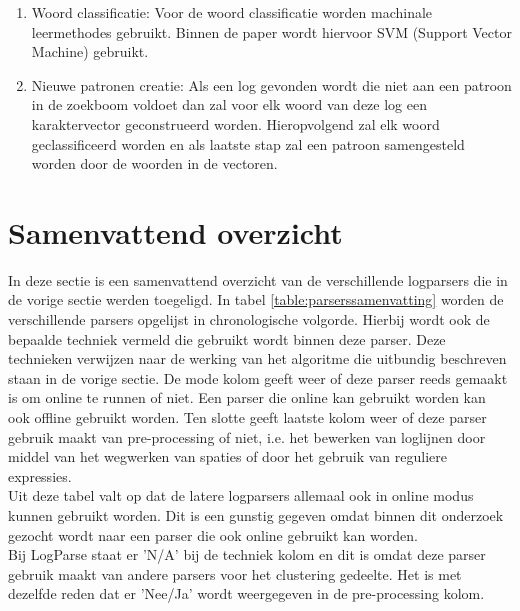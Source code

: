 \begin{itemize}
\begin{enumerate}
        \item Woord classificatie: Voor de woord classificatie worden machinale leermethodes gebruikt. Binnen de paper wordt hiervoor SVM (Support Vector Machine) gebruikt.
        
        \item Nieuwe patronen creatie: Als een log gevonden wordt die niet aan een patroon in de zoekboom voldoet dan zal voor elk woord van deze log een karaktervector geconstrueerd worden. Hieropvolgend zal elk woord geclassificeerd worden en als laatste stap zal een patroon samengesteld worden door de woorden in de vectoren.
    \end{enumerate}
\end{itemize}

\section{Samenvattend overzicht}
In deze sectie is een samenvattend overzicht van de verschillende logparsers die in de vorige sectie werden toegeligd. In tabel \ref{table:parserssamenvatting} worden de verschillende parsers opgelijst in chronologische volgorde. Hierbij wordt ook de bepaalde techniek vermeld die gebruikt wordt binnen deze parser. Deze technieken verwijzen naar de werking van het algoritme die uitbundig beschreven staan in de vorige sectie. De mode kolom geeft weer of deze parser reeds gemaakt is om online te runnen of niet. Een parser die online kan gebruikt worden kan ook offline gebruikt worden. Ten slotte geeft laatste kolom weer of deze parser gebruik maakt van pre-processing of niet, i.e. het bewerken van loglijnen door middel van het wegwerken van spaties of door het gebruik van reguliere expressies.\\

Uit deze tabel valt op dat de latere logparsers allemaal ook in online modus kunnen gebruikt worden. Dit is een gunstig gegeven omdat binnen dit onderzoek gezocht wordt naar een parser die ook online gebruikt kan worden. \\

Bij LogParse staat er 'N/A' bij de techniek kolom en dit is omdat deze parser gebruik maakt van andere parsers voor het clustering gedeelte. Het is met dezelfde reden dat er 'Nee/Ja' wordt weergegeven in de pre-processing kolom.

